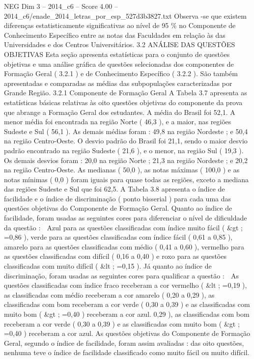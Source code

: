 \begin{textsample}{NEG Dim 3 – 2014\_c6 – Score 4.00 – 2014\_c6/enade\_2014\_letras\_por\_esp\_527d3b3827.txt}
Observa -se que existem diferenças estatisticamente significativas ao nível de 95 \% no Componente de Conhecimento Específico entre as notas das Faculdades em relação às das Universidades e dos Centros Universitários. 3.2 ANÁLISE DAS QUESTÕES OBJETIVAS Esta seção apresenta estatísticas para o conjunto de questões objetivas e uma análise gráfica de questões selecionadas dos componentes de Formação Geral ( 3.2.1 ) e de Conhecimento Específico ( 3.2.2 ).
São também apresentadas e comparadas as médias das subpopulações caracterizadas por Grande Região. 3.2.1 Componente de Formação Geral A Tabela 3.7 apresenta as estatísticas básicas relativas às oito questões objetivas do componente da prova que abrange a Formação Geral dos estudantes.
A média do Brasil foi 52,1.
A menor média foi encontrada na região Norte ( 46,3 ), e a maior, nas regiões Sudeste e Sul ( 56,1 ).
As demais médias foram : 49,8 na região Nordeste ; e 50,4 na região Centro-Oeste.
O desvio padrão do Brasil foi 21,1, sendo o maior desvio padrão encontrado na região Sudeste ( 21,6 ), e o menor, na região Sul ( 19,3 ).
Os demais desvios foram : 20,0 na região Norte ; 21,3 na região Nordeste ; e 20,2 na região Centro-Oeste.
As medianas ( 50,0 ), as notas máximas ( 100,0 ) e as notas mínimas ( 0,0 ) foram iguais para quase todas as regiões, exceto a mediana das regiões Sudeste e Sul que foi 62,5.
A Tabela 3.8 apresenta o índice de facilidade e o índice de discriminação ( ponto bisserial ) para cada uma das questões objetivas do Componente de Formação Geral.
Quanto ao índice de facilidade, foram usadas as seguintes cores para diferenciar o nível de dificuldade da questão :  Azul para as questões classificadas com índice muito fácil ( \&gt ; =0,86 ), verde para as questões classificadas com índice fácil ( 0,61 a 0,85 ), amarelo para as questões classificadas com médio ( 0,41 a 0,60 ), vermelho para as questões classificadas com difícil ( 0,16 a 0,40 ) e roxo para as questões classificadas com muito difícil ( \&lt ; =0,15 ).
Já quanto ao índice de discriminação, foram usadas as seguintes cores para qualificar a questão :  As questões classificadas com índice fraco receberam a cor vermelho ( \&lt ; =0,19 ), as classificadas com médio receberam a cor amarelo ( 0,20 a 0,29 ), as classificadas com bom receberam a cor verde ( 0,30 a 0,39 ) e as classificadas com muito bom ( \&gt ; =0,40 ) receberam a cor azul. 0,29 ), as classificadas com bom receberam a cor verde ( 0,30 a 0,39 ) e as classificadas com muito bom ( \&gt ; =0,40 ) receberam a cor azul.
As questões objetivas do Componente de Formação Geral, segundo o índice de facilidade, foram assim avaliadas : das oito questões, nenhuma teve o índice de facilidade classificado como muito fácil ou muito difícil.

\end{textsample}
